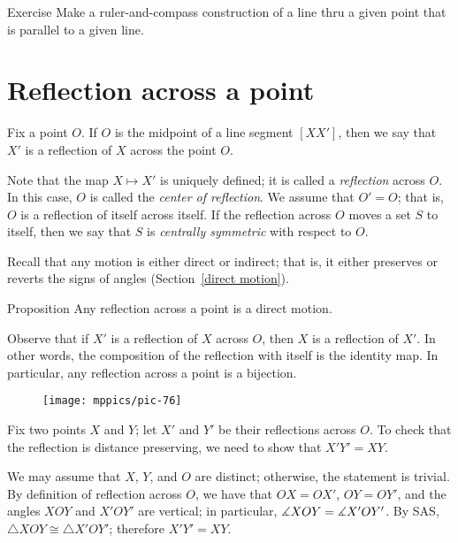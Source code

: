 \begin{thm}{Exercise}\label{ex:construction-parallel}
Make a ruler-and-compass construction of a line thru a given point that is parallel to a given line.
\end{thm}

\section{Reflection across a point}

Fix a point $O$.
If $O$ is the midpoint of a line segment $[XX']$, then we say that $X'$ is a reflection of $X$ across the point $O$.

Note that the map $X\mapsto X'$ is uniquely defined; it is called a \emph{reflection} across $O$.
In this case, $O$ is called the \emph{center of reflection}. 
We assume that $O'=O$; that is, $O$ is a reflection of itself across itself.
If the reflection across $O$ moves a set $S$ to itself, then we say that $S$ is \emph{centrally symmetric} with respect to $O$. 

Recall that any motion is either direct or indirect;
that is, it either preserves or reverts the signs of angles (Section~\ref{direct motion}). 

\begin{thm}[\abs]{Proposition}\label{prop:point-reflection}
Any reflection across a point is a direct motion.
\end{thm}

Observe that if $X'$ is a reflection of $X$ across $O$, 
then $X$ is a reflection of $X'$.
In other words, the composition of the reflection with itself is the identity map.
In particular, any reflection across a point is a bijection.

\begin{wrapfigure}{o}{33mm}
\centering
\texttt{[image: mppics/pic-76]}
\end{wrapfigure}

Fix two points $X$ and $Y$;
let $X'$ and $Y'$ be their reflections across $O$.
To check that the reflection is distance preserving, we need to show that $X'Y'=XY$.

We may assume that $X$, $Y$, and $O$ are distinct; otherwise, the statement is trivial.
By definition of reflection across $O$, we have that $OX=OX'$, $OY=OY'$, and the angles $XOY$ and $X'OY'$ are vertical;
in particular, $\measuredangle XOY\z=\measuredangle X'OY'$.
By SAS, $\triangle XOY\cong\triangle X'OY'$;
therefore $X'Y'=XY$.

